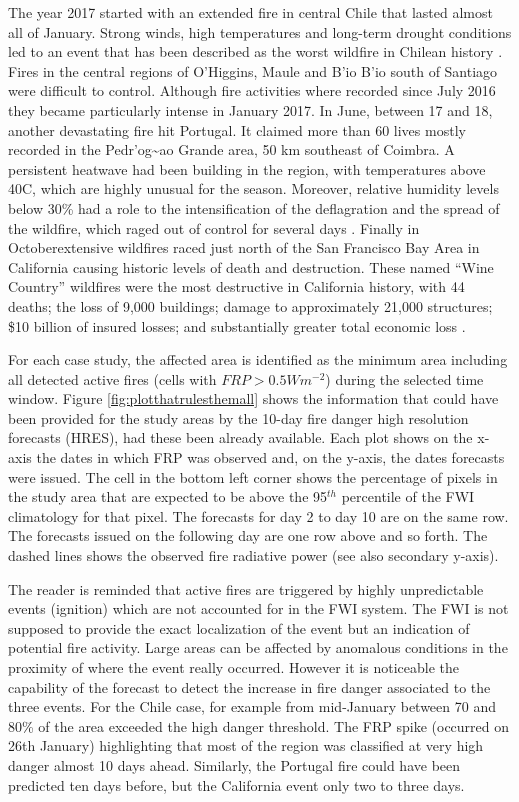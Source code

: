 \documentclass[, manuscript]{copernicus}
\begin{document}
The year 2017 started with an extended fire in central Chile that lasted
almost all of January. Strong winds, high temperatures and long-term
drought conditions led to an event that has been described as the worst
wildfire in Chilean history \citep{bowman:18}. Fires in the central
regions of O'Higgins, Maule and B'io B'io south of Santiago were
difficult to control. Although fire activities where recorded since July
2016 they became particularly intense in January 2017. In June, between
17 and 18, another devastating fire hit Portugal. It claimed more than
60 lives mostly recorded in the Pedr'og\textasciitilde{}ao Grande area,
50 km southeast of Coimbra. A persistent heatwave had been building in
the region, with temperatures above 40C, which are highly unusual for
the season. Moreover, relative humidity levels below 30\% had a role to
the intensification of the deflagration and the spread of the wildfire,
which raged out of control for several days \citep{boer:17}. Finally in
Octoberextensive wildfires raced just north of the San Francisco Bay
Area in California causing historic levels of death and destruction.
These named ``Wine Country'' wildfires were the most destructive in
California history, with 44 deaths; the loss of 9,000 buildings; damage
to approximately 21,000 structures; \$10 billion of insured losses; and
substantially greater total economic loss \citep{nauslar:18,mass:19}.

For each case study, the affected area is identified as the minimum area
including all detected active fires (cells with \(FRP > 0.5 Wm^{-2}\))
during the selected time window. Figure \ref{fig:plotthatrulesthemall}
shows the information that could have been provided for the study areas
by the 10-day fire danger high resolution forecasts (HRES), had these
been already available. Each plot shows on the x-axis the dates in which
FRP was observed and, on the y-axis, the dates forecasts were issued.
The cell in the bottom left corner shows the percentage of pixels in the
study area that are expected to be above the 95\(^{th}\) percentile of
the FWI climatology for that pixel. The forecasts for day 2 to day 10
are on the same row. The forecasts issued on the following day are one
row above and so forth. The dashed lines shows the observed fire
radiative power (see also secondary y-axis).

The reader is reminded that active fires are triggered by highly
unpredictable events (ignition) which are not accounted for in the FWI
system. The FWI is not supposed to provide the exact localization of the
event but an indication of potential fire activity. Large areas can be
affected by anomalous conditions in the proximity of where the event
really occurred. However it is noticeable the capability of the forecast
to detect the increase in fire danger associated to the three events.
For the Chile case, for example from mid-January between 70 and 80\% of
the area exceeded the high danger threshold. The FRP spike (occurred on
26th January) highlighting that most of the region was classified at
very high danger almost 10 days ahead. Similarly, the Portugal fire
could have been predicted ten days before, but the California event only
two to three days.
\end{document}
